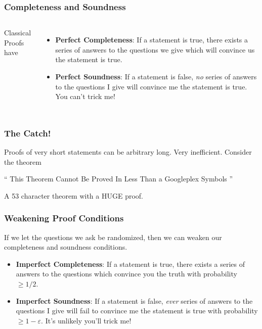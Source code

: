 \documentclass{beamer}
\begin{document}
\begin{frame}
    \frametitle{Completeness and Soundness}

    \begin{columns}

    \begin{center} Classical Proofs have \end{center}
    \begin{itemize}
        \item {\bf Perfect Completeness}: If a statement is true, there exists a series of answers to the questions we give which will convince us the statement is true.

        \item {\bf Perfect Soundness}: If a statement is false, {\it no} series of answers to the questions I give will convince me the statement is true. You can't trick me!
    \end{itemize}

    \end{columns}
\end{frame}

\begin{frame}
    \frametitle{The Catch!}

    Proofs of very short statements can be arbitrary long. Very inefficient. Consider the theorem
    \begin{center}
        `` This Theorem Cannot Be Proved In Less Than a Googleplex Symbols ''
    \end{center}
    A 53 character theorem with a HUGE proof.
\end{frame}

\begin{frame}
    \frametitle{Weakening Proof Conditions}

    If we let the questions we ask be randomized, then we can weaken our completeness and soundness conditions.
    \begin{itemize}
        \item {\bf Imperfect Completeness}: If a statement is true, there exists a series of answers to the questions which convince you the truth with probability $\geq 1/2$.

        \item {\bf Imperfect Soundness}: If a statement is false, {\it ever} series of answers to the questions I give will fail to convince me the statement is true with probability $\geq 1 - \varepsilon$. It's unlikely you'll trick me!
    \end{itemize}
\end{frame}
\end{document}
